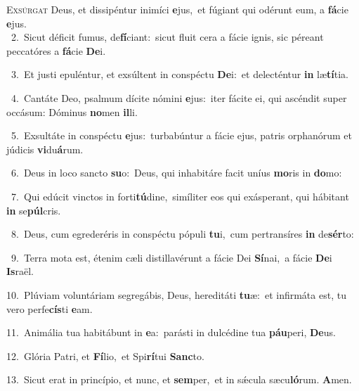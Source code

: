 \lettrine{\initial\textcolor{\initialcolor}{E}}{xsúrgat} Deus, et dissipéntur inimíci \textbf{e}\-jus,~\star et fúgiant qui odérunt eum, a \textbf{fá}\-cie \textbf{e}\-jus.\\
{\numbfont\textcolor{\numbcolor}{~2.}}~Sicut déficit fumus, de\-\textbf{fí}\-ciant:~\star sicut fluit cera a fácie ignis, sic péreant peccatóres a \textbf{fá}\-cie \textbf{De}\-i.\par
{\numbfont\textcolor{\numbcolor}{~3.}}~Et justi epuléntur, et exsúltent in conspéctu \textbf{De}\-i:~\star et delecténtur \textbf{in} læ\-\textbf{tí}\-tia.\par
{\numbfont\textcolor{\numbcolor}{~4.}}~Cantáte Deo, psalmum dícite nómini \textbf{e}\-jus:~\star iter fácite ei, qui ascéndit super occásum: Dóminus \textbf{no}\-men \textbf{il}\-li.\par
{\numbfont\textcolor{\numbcolor}{~5.}}~Exsultáte in conspéctu \textbf{e}\-jus:~\star turbabúntur a fácie ejus, patris orphanórum et júdicis \textbf{vi}\-du\-\textbf{á}\-rum.\par
{\numbfont\textcolor{\numbcolor}{~6.}}~Deus in loco sancto \textbf{su}\-o:~\star Deus, qui inhabitáre facit uníus \textbf{mo}\-ris in \textbf{do}\-mo:\par
{\numbfont\textcolor{\numbcolor}{~7.}}~Qui edúcit vinctos in forti\-\textbf{tú}\-dine,~\star simíliter eos qui exásperant, qui hábitant \textbf{in} se\-\textbf{púl}\-cris.\par
{\numbfont\textcolor{\numbcolor}{~8.}}~Deus, cum egrederéris in conspéctu pópuli \textbf{tu}\-i,~\star cum pertransíres \textbf{in} de\-\textbf{sér}\-to:\par
{\numbfont\textcolor{\numbcolor}{~9.}}~Terra mota est, étenim cæli distillavérunt a fácie Dei \textbf{Sí}\-nai,~\star a fácie \textbf{De}\-i \textbf{Is}\-raël.\par
{\numbfont\textcolor{\numbcolor}{10.}}~Plúviam voluntáriam segregábis, Deus, hereditáti \textbf{tu}\-æ:~\star et infirmáta est, tu vero perfe\-\textbf{cís}\-ti \textbf{e}\-am.\par
{\numbfont\textcolor{\numbcolor}{11.}}~Animália tua habitábunt in \textbf{e}\-a:~\star parásti in dulcédine tua \textbf{páu}\-peri, \textbf{De}\-us.\par
{\numbfont\textcolor{\numbcolor}{12.}}~Glória Patri, et \textbf{Fí}\-lio,~\star et Spi\-\textbf{rí}\-tui \textbf{Sanc}\-to.\par
{\numbfont\textcolor{\numbcolor}{13.}}~Sicut erat in princípio, et nunc, et \textbf{sem}\-per,~\star et in sǽcula sæcu\-\textbf{ló}\-rum. \textbf{A}\-men.\par
